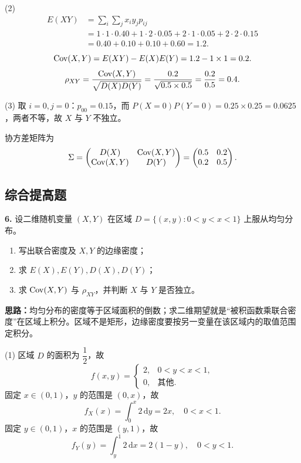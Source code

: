 (2)
\[
\begin{aligned}
E(XY)&=\sum_{i}\sum_{j}x_iy_jp_{ij}\\
&=1\cdot1\cdot0.40+1\cdot2\cdot0.05+2\cdot1\cdot0.05+2\cdot2\cdot0.15\\
&=0.40+0.10+0.10+0.60=1.2.
\end{aligned}
\]
\[
\operatorname{Cov}(X,Y)=E(XY)-E(X)E(Y)=1.2-1\times1=0.2.
\]
\[
\rho_{XY}=\frac{\operatorname{Cov}(X,Y)}{\sqrt{D(X)D(Y)}}=\frac{0.2}{\sqrt{0.5\times0.5}}=\frac{0.2}{0.5}=0.4.
\]

(3) 取 $i=0,j=0$：$p_{00}=0.15$，而 $P(X=0)P(Y=0)=0.25\times0.25=0.0625$，两者不等，故 $X$ 与 $Y$ 不独立。

协方差矩阵为
\[
\Sigma=\begin{pmatrix}D(X)&\operatorname{Cov}(X,Y)\\\operatorname{Cov}(X,Y)&D(Y)\end{pmatrix}
=\begin{pmatrix}0.5&0.2\\0.2&0.5\end{pmatrix}.
\]


\else \answerarea[10] \fi

\subsection{综合提高题}

\textbf{6.} 设二维随机变量 $(X,Y)$ 在区域 $D=\{(x,y):0<y<x<1\}$ 上服从均匀分布。
\begin{enumerate}[label=(\arabic*)]
    \item 写出联合密度及 $X,Y$ 的边缘密度；
    \item 求 $E(X),E(Y),D(X),D(Y)$；
    \item 求 $\operatorname{Cov}(X,Y)$ 与 $\rho_{XY}$，并判断 $X$ 与 $Y$ 是否独立。
\end{enumerate}

\ifshowsolutions%
\textbf{思路：}均匀分布的密度等于区域面积的倒数；求二维期望就是“被积函数乘联合密度”在区域上积分。区域不是矩形，边缘密度要按另一变量在该区域内的取值范围定积分。

(1) 区域 $D$ 的面积为 $\dfrac12$，故
\[
f(x,y)=\begin{cases}2,&0<y<x<1,\\0,&\text{其他}.\end{cases}
\]
固定 $x\in(0,1)$，$y$ 的范围是 $(0,x)$，故
\[
f_X(x)=\int_0^x2\,\mathrm{d}y=2x,\quad 0<x<1.
\]
固定 $y\in(0,1)$，$x$ 的范围是 $(y,1)$，故
\[
f_Y(y)=\int_y^1 2\,\mathrm{d}x=2(1-y),\quad 0<y<1.
\]

